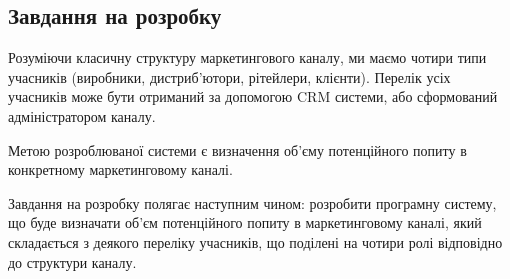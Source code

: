 \subsection{Завдання на розробку}

Розуміючи класичну структуру маркетингового каналу, ми маємо чотири типи учасників (виробники, дистриб’ютори, рітейлери, клієнти). Перелік усіх учасників може бути отриманий за допомогою CRM системи, або сформований адміністратором каналу.

Метою розроблюваної системи є визначення об’єму потенційного попиту в конкретному маркетинговому каналі.

Завдання на розробку полягає наступним чином: розробити програмну систему, що буде визначати об’єм потенційного попиту в маркетинговому каналі, який складається з деякого переліку учасників, що поділені на чотири ролі відповідно до структури каналу.

